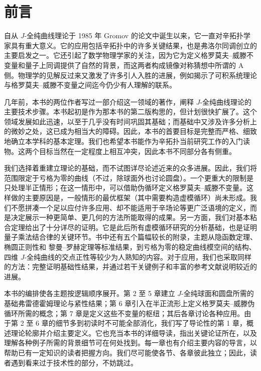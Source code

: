
\chapter*{前言}

\begingroup\small

自从 $J$-全纯曲线理论于 1985 年 Gromov 的论文中诞生以来，它一直对辛拓扑学家具有重大意义。它的应用包括辛拓扑中的许多关键结果，也是弗洛尔同调创立的主要启发之一。它还引起了数学物理学家的关注，因为它为定义格罗莫夫--威滕不变量和量子上同调提供了自然的背景，而这两者构成镜像对称猜想中所谓的 A 侧。物理学的见解反过来又激发了许多引人入胜的进展，例如揭示了可积系统理论与格罗莫夫--威滕不变量之间迄今仍少有人理解的联系。

几年前，本书的两位作者写过一部介绍这一领域的著作，阐释 $J$-全纯曲线理论的主要技术步骤。本书起初是作为那本书的第二版构思的，但计划很快扩展了。这个领域发展如此迅速，以至于几乎没有时间巩固其基础；而基础中又涉及许多分析上的微妙之处，这已成为相当大的障碍。因此，本书的首要目标是完整而严格、细致地确立本学科的基本定理。我们也希望本书能作为辛拓扑当前研究工作的入门读物。这两个目标当然在一定程度上相互冲突，因此本书不同部分各有侧重。

我们选择着重建立理论的基础，而不试图详尽论述近来的众多进展。因此，我们将范围限定于亏格为零的曲线（不过，除球面外也讨论圆盘）。一个更重大的限制是只处理半正情形；在这一情形中，可以借助伪循环定义格罗莫夫--威滕不变量。这样做的主要原因是，一般情形的最优框架（其中需要构造虚模循环）尚未形成。我们不愿拼凑一个足以应付许多应用、却不能适用于辛场论等更广泛语境的定义，而是决定展示一种更简单、更几何的方法所能取得的成果。另一方面，我们对基本粘合定理给出了十分详尽的证明。它是此后所有虚模循环研究的分析基础，也是证明量子乘法结合律的关键环节。书中还有五个篇幅较长的附录，主题从隐函数定理、椭圆正则性和 黎曼--罗赫定理等标准结果，到亏格为零的稳定曲线模空间的结构、四维 $J$-全纯曲线的交点正性等较少为人熟知的内容。对于应用，我们也采取同样的方法：完整证明基础性结果，并通过若干关键例子和丰富的参考文献说明较近的进展。

本书的编排使各主题按逻辑顺序展开。第 2 至 5 章建立 $J$-全纯球面和圆盘所需的基础弗雷德霍姆理论与紧性结果；第 6 章引入在半正流形上定义格罗莫夫--威滕伪循环所需的概念；第 7 章是定义这些不变量的枢纽；其后各章讨论各种应用。由于第 2 至 6 章的细节多到初读时不可能全部消化，我们写了导论性的第 1 章，概述理论轮廓并介绍主要定义。它也充当本书的详细导读，指出关键论证所在，以及理解各种例子所需的背景细节可在何处找到。每一章也有介绍主要内容的导言，以帮助已有一定知识的读者把握方向。我们尽可能使各节、各章彼此独立；因此，读者遇到看来过于技术性的部分，不妨跳过。

